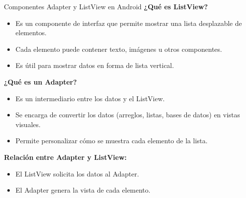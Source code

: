 \begin{frame}{Componentes Adapter y ListView en Android}
\textbf{¿Qué es ListView?}

\begin{itemize}
    \item Es un componente de interfaz que permite mostrar una lista desplazable de elementos.
    \item Cada elemento puede contener texto, imágenes u otros componentes.
    \item Es útil para mostrar datos en forma de lista vertical.
\end{itemize}

\vspace{0.4cm}

\textbf{¿Qué es un Adapter?}

\begin{itemize}
    \item Es un intermediario entre los datos y el ListView.
    \item Se encarga de convertir los datos (arreglos, listas, bases de datos) en vistas visuales.
    \item Permite personalizar cómo se muestra cada elemento de la lista.
\end{itemize}

\vspace{0.4cm}

\textbf{Relación entre Adapter y ListView:}
\begin{itemize}
    \item El ListView solicita los datos al Adapter.
    \item El Adapter genera la vista de cada elemento.
\end{itemize}


\end{frame}



